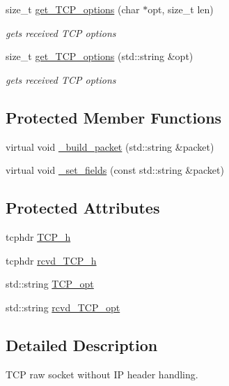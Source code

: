 \begin{CompactItemize}
size\_\-t \hyperlink{classsocketpp_1_1TCP__RawSocket_75e954caea8187c5077821cd449199e7}{get\_\-TCP\_\-options} (char $\ast$opt, size\_\-t len)
\begin{CompactList}\small\item\em gets received TCP options \item\end{CompactList}\item 
size\_\-t \hyperlink{classsocketpp_1_1TCP__RawSocket_67ab79f764a710067590427cb35aeea0}{get\_\-TCP\_\-options} (std::string \&opt)
\begin{CompactList}\small\item\em gets received TCP options \item\end{CompactList}\end{CompactItemize}
\subsection*{Protected Member Functions}
\begin{CompactItemize}
\item 
virtual void \hyperlink{classsocketpp_1_1TCP__RawSocket_d89a39d4bc91a76d0cb50da5cdd10fbc}{\_\-build\_\-packet} (std::string \&packet)
\item 
virtual void \hyperlink{classsocketpp_1_1TCP__RawSocket_6976a4726503eef03a8d446afdbaddbe}{\_\-set\_\-fields} (const std::string \&packet)
\end{CompactItemize}
\subsection*{Protected Attributes}
\begin{CompactItemize}
\item 
tcphdr \hyperlink{classsocketpp_1_1TCP__RawSocket_d1980411bd147dd67f6d9d9578414c17}{TCP\_\-h}
\item 
tcphdr \hyperlink{classsocketpp_1_1TCP__RawSocket_12b2d2f00d02c377301fc10e1209a8b8}{rcvd\_\-TCP\_\-h}
\item 
std::string \hyperlink{classsocketpp_1_1TCP__RawSocket_380529364d9488faf998543d433d8fe6}{TCP\_\-opt}
\item 
std::string \hyperlink{classsocketpp_1_1TCP__RawSocket_b7bddcb31a7a310bcf61fcc474ded465}{rcvd\_\-TCP\_\-opt}
\end{CompactItemize}


\subsection{Detailed Description}
TCP raw socket without IP header handling. 

